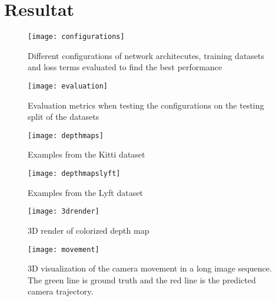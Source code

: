 \chapter{Resultat}\label{cha:Research}

\begin{figure}[H]
	\centering
	\texttt{[image: configurations]}
	\caption{Different configurations of network architecutes, training datasets and loss terms evaluated to find the best performance}
	\label{fig:conv}
\end{figure}

\begin{figure}[H]
	\centering
	\texttt{[image: evaluation]}
	\caption{Evaluation metrics when testing the configurations on the testing split of the datasets}
	\label{fig:conv}
\end{figure}

\begin{figure}[H]
	\centering
	\texttt{[image: depthmaps]}
	\caption{Examples from the Kitti dataset}
	\label{fig:conv}
\end{figure}

\begin{figure}[H]
	\centering
	\texttt{[image: depthmapslyft]}
	\caption{Examples from the Lyft dataset}
	\label{fig:conv}
\end{figure}

\begin{figure}[H]
	\centering
	\texttt{[image: 3drender]}
	\caption{3D render of colorized depth map}
	\label{fig:3drender}
\end{figure}

\begin{figure}[H]
	\centering
	\texttt{[image: movement]}
	\caption{3D visualization of the camera movement in a long image sequence. The green line is ground truth and the red line is the predicted camera trajectory.}
	\label{fig:conv}
\end{figure}